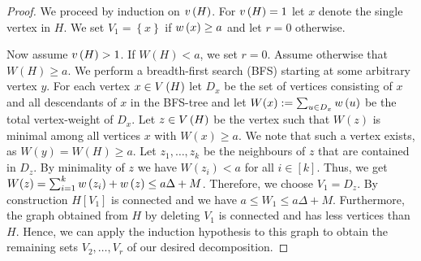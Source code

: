 \begin{proof}
We proceed by induction on $v\left({H}\right)$. For $v\left({H}\right)=1$ let $x$ denote the single vertex in $H$. We set $V_1=\left\{x\right\}$ if $w\left(x\right)\geq a$ and let $r=0$ otherwise.
 
Now assume $v\left({H}\right)>1$. If $W(H)<a$, we set $r=0$. Assume otherwise that $W(H)\geq a$. We perform a breadth-first search (BFS) starting at some arbitrary vertex $y$. For each vertex $x\in V\left(H\right)$ let $D_x$ be the set of vertices consisting of $x$ and all descendants of $x$ in the BFS-tree and let $W(x):=\sum_{u\in D_x}w\left(u\right)$ be the total vertex-weight of $D_x$. Let $z\in V\left(H\right)$ be the vertex such that $W(z)$ is minimal among all vertices $x$ with $W(x)\geq a$. We note that such a vertex exists, as $W(y)=W(H)\geq a$. Let $z_1, \ldots, z_k$ be the neighbours of $z$ that are contained in $D_z$. By minimality of $z$ we have $W(z_i)<a$ for all $i\in[k]$. Thus, we get $W(z)=\sum_{i=1}^{k}w\left(z_i\right)+w\left(z\right)\leq a\Delta +M$. Therefore, we choose $V_1=D_z$. By construction $H\left[V_1\right]$ is connected and we have $a\leq W_1\leq a \Delta+M$. Furthermore, the graph obtained from $H$ by deleting $V_1$ is connected and has less vertices than $H$. Hence, we can apply the induction hypothesis to this graph to obtain the remaining sets $V_2, \ldots, V_r$ of our desired decomposition.
\end{proof}


